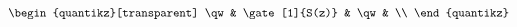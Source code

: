 \documentclass[10pt]{article}
\begin{document}
\[\begin{quantikz}[transparent]
    \qw &     \gate[1]{S(z)}    & \qw & \\
  \end{quantikz}
\]
\end{document}
